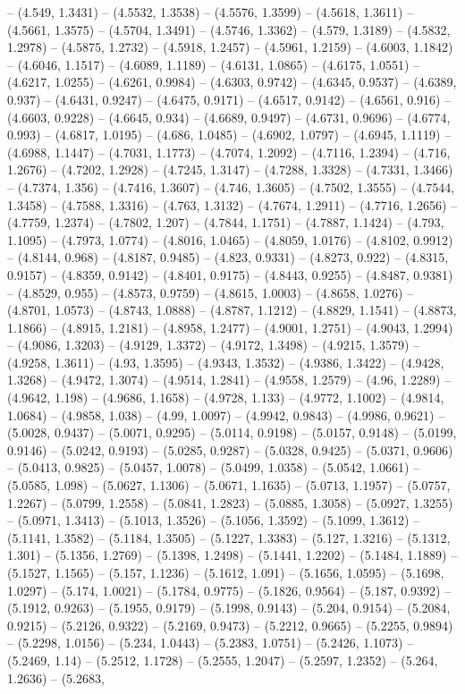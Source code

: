 -- (4.549, 1.3431) -- (4.5532, 1.3538) -- (4.5576, 1.3599) -- (4.5618, 1.3611) -- (4.5661, 1.3575) -- (4.5704, 1.3491) -- (4.5746, 1.3362) -- (4.579, 1.3189) -- (4.5832, 1.2978) -- (4.5875, 1.2732) -- (4.5918, 1.2457) -- (4.5961, 1.2159) -- (4.6003, 1.1842) -- (4.6046, 1.1517) -- (4.6089, 1.1189) -- (4.6131, 1.0865) -- (4.6175, 1.0551) -- (4.6217, 1.0255) -- (4.6261, 0.9984) -- (4.6303, 0.9742) -- (4.6345, 0.9537) -- (4.6389, 0.937) -- (4.6431, 0.9247) -- (4.6475, 0.9171) -- (4.6517, 0.9142) -- (4.6561, 0.916) -- (4.6603, 0.9228) -- (4.6645, 0.934) -- (4.6689, 0.9497) -- (4.6731, 0.9696) -- (4.6774, 0.993) -- (4.6817, 1.0195) -- (4.686, 1.0485) -- (4.6902, 1.0797) -- (4.6945, 1.1119) -- (4.6988, 1.1447) -- (4.7031, 1.1773) -- (4.7074, 1.2092) -- (4.7116, 1.2394) -- (4.716, 1.2676) -- (4.7202, 1.2928) -- (4.7245, 1.3147) -- (4.7288, 1.3328) -- (4.7331, 1.3466) -- (4.7374, 1.356) -- (4.7416, 1.3607) -- (4.746, 1.3605) -- (4.7502, 1.3555) -- (4.7544, 1.3458) -- (4.7588, 1.3316) -- (4.763, 1.3132) -- (4.7674, 1.2911) -- (4.7716, 1.2656) -- (4.7759, 1.2374) -- (4.7802, 1.207) -- (4.7844, 1.1751) -- (4.7887, 1.1424) -- (4.793, 1.1095) -- (4.7973, 1.0774) -- (4.8016, 1.0465) -- (4.8059, 1.0176) -- (4.8102, 0.9912) -- (4.8144, 0.968) -- (4.8187, 0.9485) -- (4.823, 0.9331) -- (4.8273, 0.922) -- (4.8315, 0.9157) -- (4.8359, 0.9142) -- (4.8401, 0.9175) -- (4.8443, 0.9255) -- (4.8487, 0.9381) -- (4.8529, 0.955) -- (4.8573, 0.9759) -- (4.8615, 1.0003) -- (4.8658, 1.0276) -- (4.8701, 1.0573) -- (4.8743, 1.0888) -- (4.8787, 1.1212) -- (4.8829, 1.1541) -- (4.8873, 1.1866) -- (4.8915, 1.2181) -- (4.8958, 1.2477) -- (4.9001, 1.2751) -- (4.9043, 1.2994) -- (4.9086, 1.3203) -- (4.9129, 1.3372) -- (4.9172, 1.3498) -- (4.9215, 1.3579) -- (4.9258, 1.3611) -- (4.93, 1.3595) -- (4.9343, 1.3532) -- (4.9386, 1.3422) -- (4.9428, 1.3268) -- (4.9472, 1.3074) -- (4.9514, 1.2841) -- (4.9558, 1.2579) -- (4.96, 1.2289) -- (4.9642, 1.198) -- (4.9686, 1.1658) -- (4.9728, 1.133) -- (4.9772, 1.1002) -- (4.9814, 1.0684) -- (4.9858, 1.038) -- (4.99, 1.0097) -- (4.9942, 0.9843) -- (4.9986, 0.9621) -- (5.0028, 0.9437) -- (5.0071, 0.9295) -- (5.0114, 0.9198) -- (5.0157, 0.9148) -- (5.0199, 0.9146) -- (5.0242, 0.9193) -- (5.0285, 0.9287) -- (5.0328, 0.9425) -- (5.0371, 0.9606) -- (5.0413, 0.9825) -- (5.0457, 1.0078) -- (5.0499, 1.0358) -- (5.0542, 1.0661) -- (5.0585, 1.098) -- (5.0627, 1.1306) -- (5.0671, 1.1635) -- (5.0713, 1.1957) -- (5.0757, 1.2267) -- (5.0799, 1.2558) -- (5.0841, 1.2823) -- (5.0885, 1.3058) -- (5.0927, 1.3255) -- (5.0971, 1.3413) -- (5.1013, 1.3526) -- (5.1056, 1.3592) -- (5.1099, 1.3612) -- (5.1141, 1.3582) -- (5.1184, 1.3505) -- (5.1227, 1.3383) -- (5.127, 1.3216) -- (5.1312, 1.301) -- (5.1356, 1.2769) -- (5.1398, 1.2498) -- (5.1441, 1.2202) -- (5.1484, 1.1889) -- (5.1527, 1.1565) -- (5.157, 1.1236) -- (5.1612, 1.091) -- (5.1656, 1.0595) -- (5.1698, 1.0297) -- (5.174, 1.0021) -- (5.1784, 0.9775) -- (5.1826, 0.9564) -- (5.187, 0.9392) -- (5.1912, 0.9263) -- (5.1955, 0.9179) -- (5.1998, 0.9143) -- (5.204, 0.9154) -- (5.2084, 0.9215) -- (5.2126, 0.9322) -- (5.2169, 0.9473) -- (5.2212, 0.9665) -- (5.2255, 0.9894) -- (5.2298, 1.0156) -- (5.234, 1.0443) -- (5.2383, 1.0751) -- (5.2426, 1.1073) -- (5.2469, 1.14) -- (5.2512, 1.1728) -- (5.2555, 1.2047) -- (5.2597, 1.2352) -- (5.264, 1.2636) -- (5.2683, 